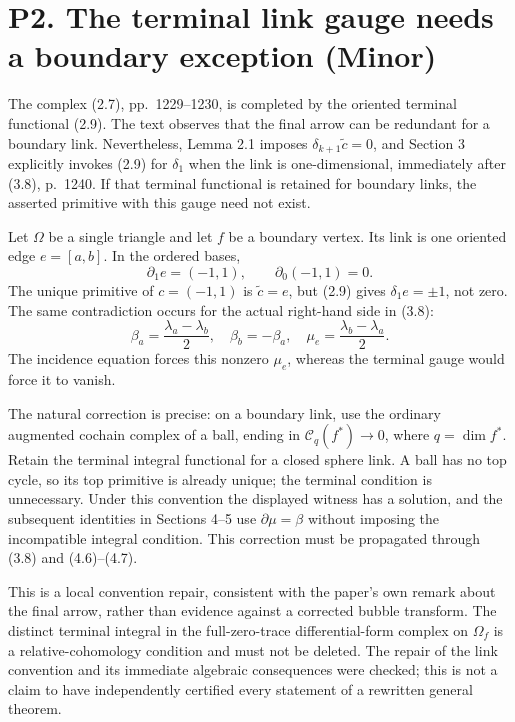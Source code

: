\documentclass[10pt]{article}
\begin{document}
\section*{P2. The terminal link gauge needs a boundary exception (Minor)}
The complex (2.7), pp. 1229–1230, is completed by the oriented terminal functional (2.9). The text observes that the final arrow can be redundant for a boundary link. Nevertheless, Lemma 2.1 imposes \(\delta_{k+1}\widetilde c=0\), and Section 3 explicitly invokes (2.9) for \(\delta_1\) when the link is one-dimensional, immediately after (3.8), p. 1240. If that terminal functional is retained for boundary links, the asserted primitive with this gauge need not exist.\par
Let \(\Omega\) be a single triangle and let \(f\) be a boundary vertex. Its link is one oriented edge \(e=[a,b]\). In the ordered bases, \[\partial_1 e=(-1,1),\qquad \partial_0(-1,1)=0 .\] The unique primitive of \(c=(-1,1)\) is \(\widetilde c=e\), but (2.9) gives \(\delta_1e=\pm1\), not zero. The same contradiction occurs for the actual right-hand side in (3.8): \[\beta_a=\frac{\lambda_a-\lambda_b}{2},\quad
\beta_b=-\beta_a,\quad
\mu_e=\frac{\lambda_b-\lambda_a}{2}.\] The incidence equation forces this nonzero \(\mu_e\), whereas the terminal gauge would force it to vanish.\par
The natural correction is precise: on a boundary link, use the ordinary augmented cochain complex of a ball, ending in \(\mathcal C_q(f^*)\to0\), where \(q=\dim f^*\). Retain the terminal integral functional for a closed sphere link. A ball has no top cycle, so its top primitive is already unique; the terminal condition is unnecessary. Under this convention the displayed witness has a solution, and the subsequent identities in Sections 4–5 use \(\partial\mu=\beta\) without imposing the incompatible integral condition. This correction must be propagated through (3.8) and (4.6)–(4.7).\par
This is a local convention repair, consistent with the paper’s own remark about the final arrow, rather than evidence against a corrected bubble transform. The distinct terminal integral in the full-zero-trace differential-form complex on \(\Omega_f\) is a relative-cohomology condition and must not be deleted. The repair of the link convention and its immediate algebraic consequences were checked; this is not a claim to have independently certified every statement of a rewritten general theorem.\par
\end{document}
